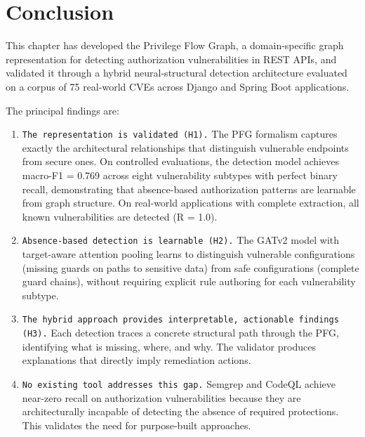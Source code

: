 \section{Conclusion}
\label{det:conclusion}

This chapter has developed the Privilege Flow Graph, a domain-specific graph
representation for detecting authorization vulnerabilities in REST APIs, and
validated it through a hybrid neural-structural detection architecture
evaluated on a corpus of 75 real-world CVEs across Django and Spring Boot
applications.

The principal findings are:
\begin{enumerate}
    \item \texttt{The representation is validated (H1).} The PFG formalism
    captures exactly the architectural relationships that distinguish
    vulnerable endpoints from secure ones. On controlled evaluations, the
    detection model achieves macro-F1 = 0.769 across eight vulnerability
    subtypes with perfect binary recall, demonstrating that absence-based
    authorization patterns are learnable from graph structure. On
    real-world applications with complete extraction, all known
    vulnerabilities are detected (R = 1.0).

    \item \texttt{Absence-based detection is learnable (H2).} The GATv2
    model with target-aware attention pooling learns to distinguish
    vulnerable configurations (missing guards on paths to sensitive data)
    from safe configurations (complete guard chains), without requiring
    explicit rule authoring for each vulnerability subtype.

    \item \texttt{The hybrid approach provides interpretable, actionable
    findings (H3).} Each detection traces a concrete structural path through
    the PFG, identifying what is missing, where, and why. The validator
    produces explanations that directly imply remediation actions.

    \item \texttt{No existing tool addresses this gap.} Semgrep and CodeQL
    achieve near-zero recall on authorization vulnerabilities because they
    are architecturally incapable of detecting the absence of required
    protections. This validates the need for purpose-built approaches.
\end{enumerate}

